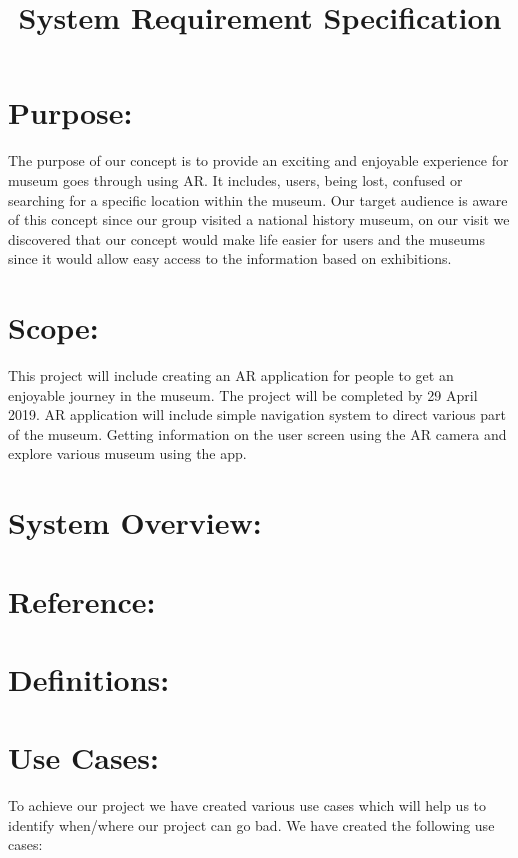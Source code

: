 
\title{System Requirement Specification}
\section{Purpose:}
The purpose of our concept is to provide an exciting and enjoyable experience for museum goes through using AR. It includes, users, being lost, confused or searching for a specific location within the museum. Our target audience is aware of this concept since our group visited a national history museum, on our visit we discovered that our concept would make life easier for users and the museums since it would allow easy access to the information based on exhibitions.

\section{Scope:}
This project will include creating an AR application for people to get an enjoyable journey in the museum. The project will be completed by 29 April 2019. AR application will include simple navigation system to direct various part of the museum. Getting information on the user screen using the AR camera and explore various museum using the app. 

\section{System Overview:}

\section{Reference:}

\section{Definitions:}

\section{Use Cases:}
To achieve our project we have created various use cases which will help us to identify when/where our project can go bad. We have created the following use cases:

